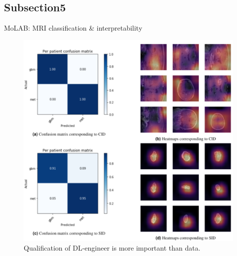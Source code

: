 \documentclass[10pt, xcolor=x11names,compress]{beamer}
\begin{document}
\subsection{Subsection5}
\begin{frame}{MoLAB: MRI classification \& interpretability}
	\begin{figure}
		\centering
		\includegraphics[height=.8\textheight]{images/molab.png}
		\caption{Qualification of DL-engineer is more important than data.}
	\end{figure}
\end{frame}
\end{document}
